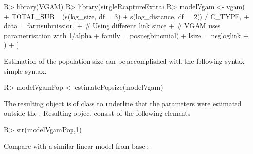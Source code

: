 \documentclass[
]{jss}
\newcommand{\1}{\mathcal{I}} \newcommand{\bZero}{\boldsymbol{0}}
\begin{document}
\begin{CodeChunk}
\begin{CodeInput}
R> library(VGAM)
R> library(singleRcaptureExtra)
R> modelVgam <- vgam(
+   TOTAL_SUB ~ (s(log_size, df  = 3) + s(log_distance, df  = 2)) / C_TYPE,
+   data = farmsubmission,
+   # Using different link since
+   # VGAM uses parametrisation with 1/alpha
+   family = posnegbinomial(
+     lsize = negloglink
+   )
+ )
\end{CodeInput}
\end{CodeChunk}

Estimation of the population size can be accomplished with the following
syntax simple syntax.

\begin{CodeChunk}
\begin{CodeInput}
R> modelVgamPop <- estimatePopsize(modelVgam)
\end{CodeInput}
\end{CodeChunk}

The resulting object is of class  to underline that
the parameters were estimated outside the .
Resulting object consist of the following elements

\begin{CodeChunk}
\begin{CodeInput}
R> str(modelVgamPop,1)
\end{CodeInput}
\end{CodeChunk}

Compare with a similar linear model from base :
\small
\end{document}
